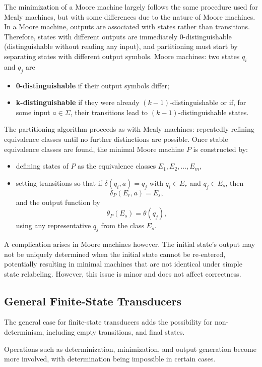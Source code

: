 The minimization of a Moore machine largely follows the same procedure used for Mealy machines, 
but with some differences due to the nature of Moore machines. In a Moore machine, outputs are associated with states rather than transitions. 
Therefore, states with different outputs are immediately 0-distinguishable (distinguishable without reading any input), 
and partitioning must start by separating states with different output symbols.\cite{linz2011formal}
Moore machines: two states \(q_i\) and \(q_j\) are
\begin{itemize}
    \item \textbf{0-distinguishable} if their output symbols differ;
    \item \textbf{k-distinguishable} if they were already \((k-1)\)-distinguishable or if, for some input \(a \in \Sigma\), 
    their transitions lead to \((k-1)\)-distinguishable states.
\end{itemize}
The partitioning algorithm proceeds as with Mealy machines: repeatedly refining equivalence classes until no further distinctions are possible.
Once stable equivalence classes are found, the minimal Moore machine \(P\) is constructed by:
    \begin{itemize}
        \item defining states of \(P\) as the equivalence classes \(E_1, E_2, \ldots, E_m\),
        \item setting transitions so that if \(\delta(q_i, a) = q_j\) with \(q_i \in E_r\) and \(q_j \in E_s\), then
        \[
        \delta_P(E_r, a) = E_s,
        \]
        and the output function by
        \[
        \theta_P(E_s) = \theta(q_j),
        \]
        using any representative \(q_j\) from the class \(E_s\).
    \end{itemize}
A complication arises in Moore machines however. The initial state's output may not be uniquely 
determined when the initial state cannot be re-entered, potentially resulting in minimal machines that are not
identical under simple state relabeling. However, this issue is minor and does not affect correctness.

\subsection{General Finite-State Transducers}

The general case for finite-state transducers adds the possibility for non-determinism, including empty transitions, and final states.

Operations such as determinization, minimization\cite{mohri1998minimization}, 
and output generation become more involved, with determination being impossible in certain cases. 

